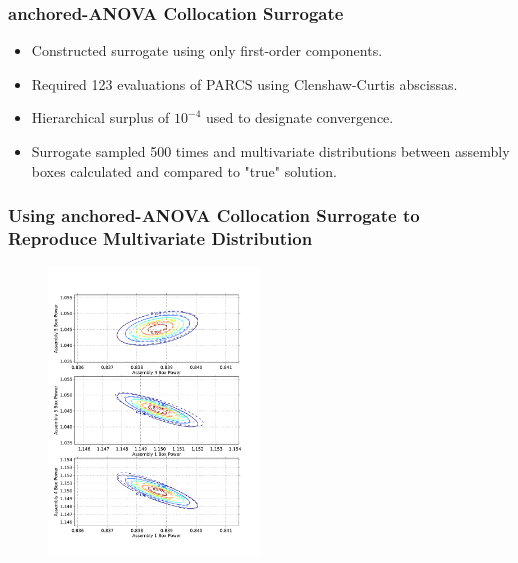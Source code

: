 \documentclass{beamer}
\begin{document}
\begin{frame}
\frametitle{anchored-ANOVA Collocation Surrogate}

\begin{itemize}
  \item Constructed surrogate using only first-order components.
  \item Required 123 evaluations of PARCS using Clenshaw-Curtis abscissas.
  \item Hierarchical surplus of $10^{-4}$ used to designate convergence.
  \item Surrogate sampled 500 times and multivariate distributions between assembly boxes calculated and compared to "true" solution. 
\end{itemize}

\end{frame}
\begin{frame}
\frametitle{Using anchored-ANOVA Collocation Surrogate to Reproduce Multivariate Distribution}

\begin{figure}
 \begin{center}
  \includegraphics[width=0.50\textwidth]{./tmi_correlations.pdf}
 \end{center}
\end{figure} 

\end{frame}

\end{document}
